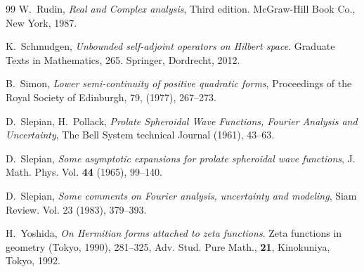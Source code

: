 \documentclass[cupthm]{CUP-JNL-JMJ}
\numberwithin{equation}{section}
\theoremstyle{cupplain}
\theoremstyle{cupdefinition}
\theoremstyle{cupremark}
\theoremstyle{cupproof}
\begin{document}
\begin{Backmatter}
\begin{thebibliography}{99}
 W.~Rudin, {\em Real and Complex analysis}, Third edition. McGraw-Hill Book Co., New York, 1987.

 K.~Schmudgen, {\em Unbounded self-adjoint operators on Hilbert space}. Graduate Texts in Mathematics, 265. Springer, Dordrecht, 2012. 

 B.~Simon, {\em Lower semi-continuity of positive quadratic forms}, Proceedings of the Royal Society of Edinburgh, 79, (1977), 267--273.


 D.~Slepian, H.~Pollack, \emph{Prolate Spheroidal Wave Functions, Fourier Analysis and Uncertainty}, The Bell System technical Journal (1961), 43--63.  

 D.~Slepian, \emph{Some asymptotic expansions for prolate spheroidal wave functions},  J. Math. Phys.  Vol. \textbf{44} (1965), 99--140.

 D.~Slepian, \emph{Some comments on Fourier analysis, uncertainty and modeling},  Siam Review.  Vol. 23 (1983), 379--393.

 H.~Yoshida,  \emph{On Hermitian forms attached to zeta functions}. Zeta functions in geometry (Tokyo, 1990), 281--325, Adv. Stud. Pure Math., \textbf{21}, Kinokuniya, Tokyo, 1992.









\end{thebibliography}




\end{Backmatter}
\end{document}
